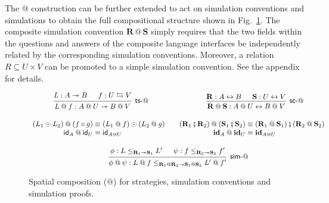 \documentclass[acmsmall,screen,review,anonymous,nonacm]{acmart}
\newcommand{\kw}[1]{\ensuremath{ \mathsf{#1} }}
\newcommand{\lensarrow}{\leftrightarrows}
\newcommand{\idsc}{\mathbf{id}} %
\newcommand{\vcomp}{\fatsemi}
\begin{document}
The $\mathbin@$ construction can be further extended
to act on simulation conventions and simulations
to obtain the full compositional structure shown in Fig.~\ref{fig:xcomp}.
The composite simulation convention $\mathbf{R} \mathbin@ \mathbf{S}$
simply requires that the two fields within the questions and answers
of the composite language interfaces
be independently related by the corresponding simulation conventions.
Moreover, a relation $R \subseteq U \times V$
can be promoted to a simple simulation convention.
See the appendix for details.


\begin{figure} %
  \begin{gather*}
    \begin{prooftree}
      \hypo{L : A \twoheadrightarrow B}
      \hypo{f : U \lensarrow V}
      \infer2[\kw{ts}-$\mathbin@$]{
        L \mathbin@ f : A \mathbin@ U \twoheadrightarrow B \mathbin@ V
      }
    \end{prooftree}
    \hspace{8em}
    \begin{prooftree}
      \hypo{\mathbf{R} : A \leftrightarrow B}
      \hypo{\mathbf{S} : U \leftrightarrow V}
      \infer2[\kw{sc}-$\mathbin@$]{
        \mathbf{R} \mathbin@ \mathbf{S} : A \mathbin@ U \leftrightarrow B \mathbin@ V
      }
    \end{prooftree}
    \\[1em]
    \begin{array}{r@{}l}
      (L_1 \odot L_2) \mathbin@ (f \circ g) & {} \equiv
      (L_1 \mathbin@ f) \odot (L_2 \mathbin@ g) \\
      \kw{id}_A \mathbin@ \kw{id}_U & {} \equiv \kw{id}_{A \mathbin@ U}
    \end{array}
    \quad
    \begin{array}{r@{}l}
      (\mathbf{R}_1 \vcomp \mathbf{R}_2) \mathbin@ (\mathbf{S}_1 \vcomp \mathbf{S}_2)
      & {} \equiv
      (\mathbf{R}_1 \mathbin@ \mathbf{S}_1) \vcomp (\mathbf{R}_2 \mathbin@ \mathbf{S}_2)
      \\
      \idsc_A \mathbin@ \idsc_U & {} \equiv \idsc_{A \mathbin@ U}
    \end{array}
    \\[1em]
    \begin{prooftree}
      \hypo{\phi: L \le_{\mathbf{R}_1 \twoheadrightarrow \mathbf{S}_1} L'}
      \hypo{\psi: f \le_{\mathbf{R}_2 \twoheadrightarrow \mathbf{S}_2} f'}
      \infer2[\kw{sim}-$\mathbin@$]{\phi \mathbin@ \psi :
	L \mathbin@ f
        \le_{\mathbf{R}_1 \mathbin@ \mathbf{R}_2 \twoheadrightarrow
             \mathbf{S}_1 \mathbin@ \mathbf{S}_2}
	L' \mathbin@ f'}
    \end{prooftree}
  \end{gather*}
  \caption{Spatial composition ($\mathbin@$) for strategies,
    simulation conventions and simulation proofs.}
  \label{fig:xcomp}
\end{figure}
\end{document}
